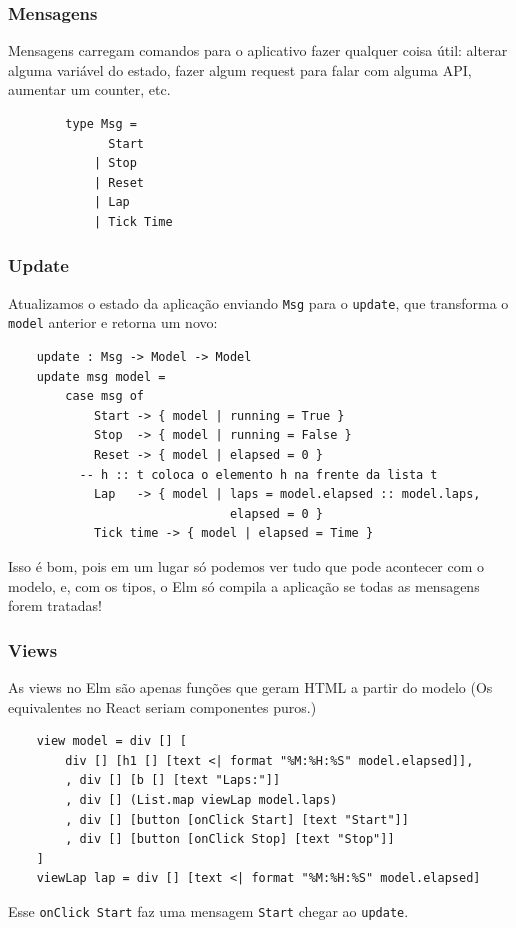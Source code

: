 \documentclass[10pt]{beamer}
\begin{document}
\begin{frame}[fragile]
	\frametitle{Mensagens}

	Mensagens carregam comandos para o aplicativo fazer qualquer coisa útil: alterar alguma variável do estado, fazer algum request para falar com alguma API, aumentar um counter, etc.
	
	\bigskip
	\begin{verbatim}
		type Msg = 
			  Start 
			| Stop
			| Reset
			| Lap
			| Tick Time
	\end{verbatim}

\end{frame}


\begin{frame}[t, fragile]
	\frametitle{Update}
	Atualizamos o estado da aplicação enviando \texttt{Msg} para o \texttt{update}, que transforma o \texttt{model} anterior e retorna um novo:
	\begin{verbatim}
	update : Msg -> Model -> Model
	update msg model =
		case msg of
			Start -> { model | running = True }
			Stop  -> { model | running = False }
			Reset -> { model | elapsed = 0 }
		  -- h :: t coloca o elemento h na frente da lista t				
			Lap   -> { model | laps = model.elapsed :: model.laps, 
			                   elapsed = 0 }
			Tick time -> { model | elapsed = Time }
	\end{verbatim}
	\bigskip
	Isso é bom, pois em um lugar só podemos ver tudo que pode acontecer com o modelo, e, com os tipos, o Elm só compila a aplicação se todas as mensagens forem tratadas!
\end{frame}


\begin{frame}[t, fragile]
	\frametitle{Views}
	\bigskip
	As views no Elm são apenas funções que geram HTML a partir do modelo (Os equivalentes no React seriam componentes puros.)
	\bigskip
	\begin{verbatim}
	view model = div [] [
		div [] [h1 [] [text <| format "%M:%H:%S" model.elapsed]],
		, div [] [b [] [text "Laps:"]]
		, div [] (List.map viewLap model.laps)
		, div [] [button [onClick Start] [text "Start"]]
		, div [] [button [onClick Stop] [text "Stop"]]
	]
	viewLap lap = div [] [text <| format "%M:%H:%S" model.elapsed]
	\end{verbatim}
	\bigskip
	Esse \texttt{onClick Start} faz uma mensagem \texttt{Start} chegar ao \texttt{update}.
\end{frame}
\end{document}
